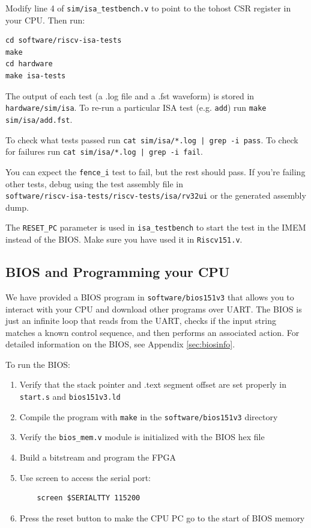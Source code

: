 \documentclass[11pt]{article}
\begin{document}
Modify line 4 of \verb|sim/isa_testbench.v| to point to the tohost CSR register in your CPU.
Then run:

\begin{verbatim}
cd software/riscv-isa-tests
make
cd hardware
make isa-tests
\end{verbatim}

The output of each test (a .log file and a .fst waveform) is stored in \verb|hardware/sim/isa|.
To re-run a particular ISA test (e.g. \verb|add|) run \verb|make sim/isa/add.fst|.

To check what tests passed run \texttt{cat sim/isa/*.log | grep -i pass}.
To check for failures run \texttt{cat sim/isa/*.log | grep -i fail}.

You can expect the \verb|fence_i| test to fail, but the rest should pass.
If you're failing other tests, debug using the test assembly file in\\\verb|software/riscv-isa-tests/riscv-tests/isa/rv32ui| or the generated assembly dump.

The \verb|RESET_PC| parameter is used in \verb|isa_testbench| to start the test in the IMEM instead of the BIOS.
Make sure you have used it in \verb|Riscv151.v|.

\subsection{BIOS and Programming your CPU}
\label{bios_info}

We have provided a BIOS program in \verb|software/bios151v3| that allows you to interact with your CPU and download other programs over UART.
The BIOS is just an infinite loop that reads from the UART, checks if the input string matches a known control sequence, and then performs an associated action.
For detailed information on the BIOS, see Appendix \ref{sec:biosinfo}.

To run the BIOS:
\begin{enumerate}
  \item Verify that the stack pointer and .text segment offset are set properly in \verb|start.s| and \verb|bios151v3.ld|
  \item Compile the program with \verb|make| in the \verb|software/bios151v3| directory
  \item Verify the \verb|bios_mem.v| module is initialized with the BIOS hex file
  \item Build a bitstream and program the FPGA
  \item Use screen to access the serial port:
    \begin{verbatim}
    screen $SERIALTTY 115200
    \end{verbatim}
  \item Press the reset button to make the CPU PC go to the start of BIOS memory
\end{enumerate}
\end{document}
